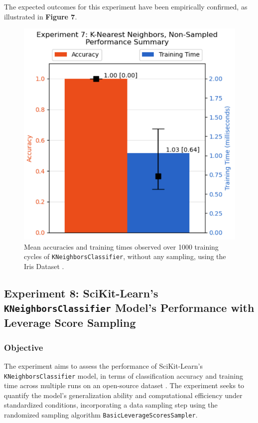 \documentclass{article}
\theoremstyle{plain}
\theoremstyle{definition}
\theoremstyle{remark}
\begin{document}
The expected outcomes for this experiment have been empirically confirmed, as illustrated in \textbf{Figure 7}.

\begin{figure}[ht]
	\vskip 0.2in
	\begin{center}
		\centerline{\includegraphics[width=\columnwidth]{experiment_07}}
		\caption{Mean accuracies and training times observed over 1000 training cycles of \texttt{KNeighborsClassifier}, without any sampling, using the Iris Dataset \cite{iris}.}
		\label{experiment_07}
	\end{center}
	\vskip -0.2in
\end{figure}


\subsection{Experiment 8: SciKit-Learn's \texttt{KNeighborsClassifier} Model's Performance with Leverage Score Sampling}

\subsubsection{Objective}

The experiment aims to assess the performance of SciKit-Learn's \texttt{KNeighborsClassifier} model, in terms of classification accuracy and training time across multiple runs on an open-source dataset \cite{iris}. The experiment seeks to quantify the model's generalization ability and computational efficiency under standardized conditions, incorporating a data sampling step using the randomized sampling algorithm \texttt{BasicLeverageScoresSampler}.
\end{document}
